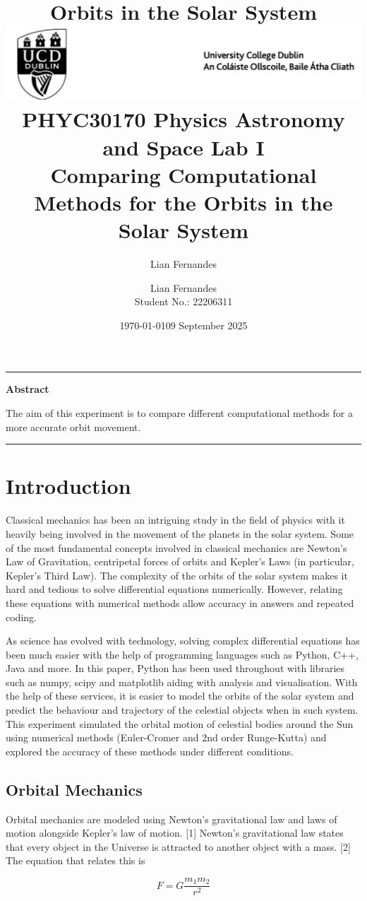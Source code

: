 \documentclass[11 pt, a4paper]{article}
\title{\bfseries Orbits in the Solar System}
\author{Lian Fernandes}
\date{\today}
\title{%
\includegraphics[width=0.9\linewidth]{UCD_Logo.png}\\ %
{\large PHYC30170 Physics Astronomy and Space Lab I}\\ %
{\bfseries Comparing Computational Methods for the Orbits in the Solar System} %
}
\author{Lian Fernandes \\ \small Student No.: 22206311}
\date{09 September 2025}
\renewenvironment{abstract}{%
  \par\noindent\rule{\linewidth}{0.4pt}\par
  \begin{center}\bfseries Abstract\end{center}%
}{%
  \par\rule{\linewidth}{0.4pt}\par
}
\begin{document}
\maketitle

\begin{abstract}

The aim of this experiment is to compare different computational methods for a more accurate orbit movement.

\end{abstract}

\section{Introduction}
Classical mechanics has been an intriguing study in the field of physics with it heavily being involved in the movement
of the planets in the solar system. Some of the most fundamental concepts involved in classical mechanics are Newton's Law
of Gravitation, centripetal forces of orbits and Kepler's Laws (in particular, Kepler's Third Law). The complexity of the orbits
of the solar system makes it hard and tedious to solve differential equations numerically. However, relating these equations with
numerical methods allow accuracy in answers and repeated coding.

As science has evolved with technology, solving complex differential equations has been much easier with the help of programming languages 
such as Python, C++, Java and more. In this paper, Python has been used throughout with libraries such as numpy, scipy and matplotlib
aiding with analysis and visualisation. With the help of these services, it is easier to model the orbits of the solar system and predict
the behaviour and trajectory of the celestial objects when in such system. This experiment simulated the orbital motion of celestial bodies 
around the Sun using numerical methods (Euler-Cromer and 2nd order Runge-Kutta) and explored the accuracy of these methods under different conditions.

\subsection{Orbital Mechanics}
Orbital mechanics are modeled using Newton's gravitational law and laws of motion alongside Kepler's law of motion. [1] Newton's gravitational 
law states that every object in the Universe is attracted to another object with a mass. [2] The equation that relates this is

\[
F = G \frac{m_1m_2}{r^2}
\tag{Eq. 1a}
\]
\end{document}
